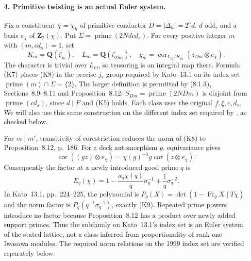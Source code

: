 \paragraph{4. Primitive twisting is an actual Euler system.}
Fix a constituent $\chi=\chi_h$ of primitive conductor
$D=|\Delta_h|=2^a d$, $d$ odd, and a basis $e_\chi$ of
$\mathbf Z_2(\chi)$. Put
$\Sigma=\operatorname{prime}(2Ndcd_s)$.
For every positive integer $m$ with $(m,cd_s)=1$, set
\[
 K_m=\mathbf Q(\zeta_m),\quad
 L_m=\mathbf Q(\zeta_{Dm}),\quad
 y_m=\operatorname{cor}_{L_m/K_m}
             (z_{Dm}\otimes e_\chi).                      \tag{K8}
\]
The character is trivial over $L_m$, so tensoring is an integral
map there. Formula (K7) places (K8) in the precise $j_*$ group
required by Kato~13.1 on its index set
$\operatorname{prime}(m)\cap\Sigma=\{2\}$. The larger definition is
permitted by (8.1.3), Sections~8.9--8.11 and Proposition~8.12:
$S_{Dm}=\operatorname{prime}(2NDm)$ is disjoint from
$\operatorname{prime}(cd_s)$, since $d\mid F$ and (K5) holds.
Each class uses the original $f,\xi,c,d_s$. We will also use this
same construction on the different index set required by
\cite[Section 0.1]{kato1999}, as checked below.

For $m\mid m'$, transitivity of corestriction reduces the norm
of (K8) to Proposition~8.12, p.~186. For a deck automorphism $g$,
equivariance gives
\[
 \operatorname{cor}((gz)\otimes e_\chi)
       =\chi(g)^{-1}g\operatorname{cor}(z\otimes e_\chi).
\]
Consequently the factor at a newly introduced good prime $q$ is
\[
 E_q(\chi)=1-\frac{a_q\chi(q)}q\sigma_q^{-1}
                         +\frac1q\sigma_q^{-2}.           \tag{K9}
\]
In Kato~13.1, pp.~224--225, the polynomial is
$P_q(X)=\det(1-\operatorname{Fr}_qX\mid T\chi)$ and the norm
factor is $P_q(q^{-1}\sigma_q^{-1})$, exactly (K9).
Repeated prime powers introduce no factor because Proposition~8.12
has a product over newly added support primes. Thus the subfamily
on Kato~13.1's index set is an Euler system of the stated lattice,
not a class inferred from proportionality of rank-one Iwasawa
modules. The required norm relations on the 1999 index set are
verified separately below.

